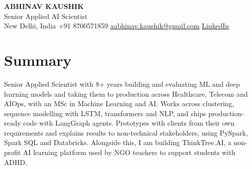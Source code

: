 \documentclass[10pt,a4paper]{article}
\begin{document}
\begin{center}
  {\LARGE\bfseries ABHINAV KAUSHIK}\\[2pt]
  {\large Senior Applied AI Scientist}\\[2pt]
  New Delhi, India \textbar{} +91 8700571859 \textbar{} \href{mailto:aabhinav.kaushik@gmail.com}{aabhinav.kaushik@gmail.com} \textbar{} \href{https://www.linkedin.com/in/abhinav-kaushik10/}{LinkedIn}  
\end{center}

\section{Summary}
Senior Applied Scientist with 8+ years building and evaluating ML and deep learning models and taking them to production across Healthcare, Telecom and AIOps, with an MSc in Machine Learning and AI. Works across clustering, sequence modelling with LSTM, transformers and NLP, and ships production-ready code with LangGraph agents. Prototypes with clients from their own requirements and explains results to non-technical stakeholders, using PySpark, Spark SQL and Databricks. Alongside this, I am building ThinkTree.AI, a non-profit AI learning platform used by NGO teachers to support students with ADHD.
\end{document}
